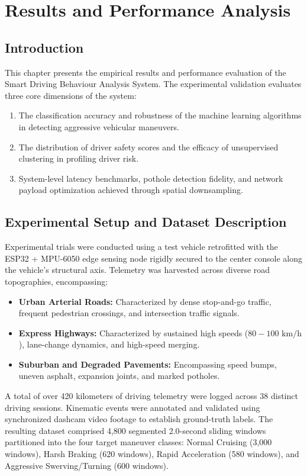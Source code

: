 \chapter{Results and Performance Analysis}
\label{chap:results}

\section{Introduction}
\label{sec:results_intro}
This chapter presents the empirical results and performance evaluation of the Smart Driving Behaviour Analysis System. The experimental validation evaluates three core dimensions of the system:
\begin{enumerate}
    \item The classification accuracy and robustness of the machine learning algorithms in detecting aggressive vehicular maneuvers.
    \item The distribution of driver safety scores and the efficacy of unsupervised clustering in profiling driver risk.
    \item System-level latency benchmarks, pothole detection fidelity, and network payload optimization achieved through spatial downsampling.
\end{enumerate}

\section{Experimental Setup and Dataset Description}
\label{sec:exp_setup}
Experimental trials were conducted using a test vehicle retrofitted with the ESP32 + MPU-6050 edge sensing node rigidly secured to the center console along the vehicle's structural axis. Telemetry was harvested across diverse road topographies, encompassing:
\begin{itemize}
    \item \textbf{Urban Arterial Roads:} Characterized by dense stop-and-go traffic, frequent pedestrian crossings, and intersection traffic signals.
    \item \textbf{Express Highways:} Characterized by sustained high speeds ($80 - 100\text{ km/h}$), lane-change dynamics, and high-speed merging.
    \item \textbf{Suburban and Degraded Pavements:} Encompassing speed bumps, uneven asphalt, expansion joints, and marked potholes.
\end{itemize}

A total of over 420 kilometers of driving telemetry were logged across 38 distinct driving sessions. Kinematic events were annotated and validated using synchronized dashcam video footage to establish ground-truth labels. The resulting dataset comprised 4,800 segmented 2.0-second sliding windows partitioned into the four target maneuver classes: Normal Cruising (3,000 windows), Harsh Braking (620 windows), Rapid Acceleration (580 windows), and Aggressive Swerving/Turning (600 windows).

